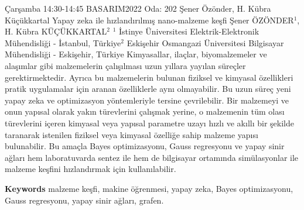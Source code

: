 
    \begin{abstract_basarim}
    {Çarşamba 14:30-14:45}
    {BASARIM2022}
    {Oda: 202}
    {Şener Özönder, H. Kübra Küçükkartal}
    {Yapay zeka ile hızlandırılmış nano-malzeme keşfi}
    {%
    Şener ÖZÖNDER$^{1}$, H. Kübra KÜÇÜKKARTAL$^{2}$}
    {%
    }
    {%
    $^1$ İstinye Üniversitesi Elektrik-Elektronik Mühendisliği - İstanbul, Türkiye\newline{}$^2$ Eskişehir Osmangazi Üniversitesi Bilgisayar Mühendisliği - Eskişehir, Türkiye}
    Kimyasallar, ilaçlar, biyomalzemeler ve alaşımlar gibi malzemelerin çalışılması uzun yıllara yayılan süreçler gerektirmektedir. Ayrıca bu malzemelerin bulunan fiziksel ve kimyasal özellikleri pratik uygulamalar için aranan özelliklerle aynı olmayabilir. Bu uzun süreç yeni yapay zeka ve optimizasyon yöntemleriyle tersine çevrilebilir. Bir malzemeyi ve onun yapısal olarak yakın türevlerini çalışmak yerine, o malzemenin tüm olası türevlerini içeren kimyasal veya yapısal parametre uzayı hızlı ve akıllı bir şekilde taranarak istenilen fiziksel veya kimyasal özelliğe sahip malzeme yapısı bulunabilir. Bu amaçla Bayes optimizasyonu, Gauss regresyonu ve yapay sinir ağları hem laboratuvarda sentez ile hem de bilgisayar ortamında simülasyonlar ile malzeme keşfini hızlandırmak için kullanılabilir. 
    
        \textbf{Keywords} \newline{}malzeme keşfi, makine öğrenmesi, yapay zeka, Bayes optimizasyonu, Gauss regresyonu, yapay sinir ağları, grafen.
    \end{abstract_basarim}
    
